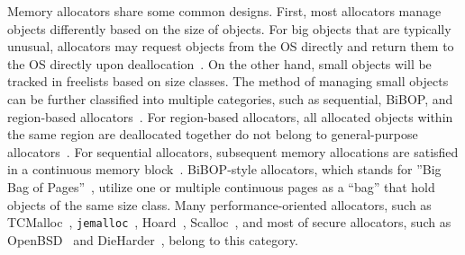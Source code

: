 Memory allocators share some common designs. First, most allocators manage objects differently based on the size of objects. For big objects that are typically unusual, allocators may request objects from the OS directly and return them to the OS directly upon deallocation~\citep{Hoard}. On the other hand, small objects will be tracked in freelists based on size classes. The method of managing small objects can be further classified into multiple categories, such as sequential, BiBOP, and region-based allocators~\citep{DieHarder, Gay:1998:MME:277650.277748}. For region-based allocators, all allocated objects within the same region are deallocated together do not belong to general-purpose allocators~\citep{Gay:1998:MME:277650.277748}. For sequential allocators, subsequent memory allocations are satisfied in a continuous memory block~\citep{Cling}. BiBOP-style allocators, which stands for ''Big Bag of Pages''~\citep{hanson1980portable}, utilize one or multiple continuous pages as a ``bag'' that hold objects of the same size class. Many performance-oriented allocators, such as TCMalloc~\citep{tcmalloc}, \texttt{jemalloc}~\citep{jemalloc}, Hoard~\citep{Hoard}, Scalloc~\citep{Scalloc}, and most of secure allocators, such as OpenBSD~\citep{openbsd} and DieHarder~\citep{DieHarder}, belong to this category. 

 

 